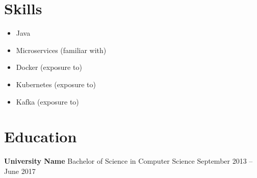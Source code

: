\documentclass[10pt,a4paper]{article}
\begin{document}
\vspace{1em}

\section*{Skills}
\begin{itemize}[leftmargin=*]
  \item Java
  \item Microservices (familiar with)
  \item Docker (exposure to)
  \item Kubernetes (exposure to)
  \item Kafka (exposure to)
\end{itemize}

\vspace{1em}

\section*{Education}
\textbf{University Name} \hfill Bachelor of Science in Computer Science \hfill September 2013 -- June 2017
\end{document}
